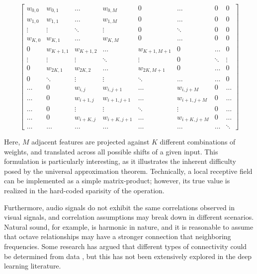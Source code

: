 \begingroup
\renewcommand*{\arraystretch}{0.8}
$$
\begin{bmatrix}
w_{0, 0} & w_{0, 1} & \dots  & w_{0, M} & 0 & \dots & 0 & 0 \\
w_{1, 0} & w_{1, 1} & \dots  & w_{1, M} & 0 & \dots & 0 & 0 \\
\vdots & \vdots & \ddots & \vdots & 0 & \ddots & 0 & 0 \\
w_{K, 0} & w_{K, 1} & \dots  & w_{K, M} & 0 & \dots & 0 & 0 \\
0 & w_{K + 1, 1} & w_{K + 1, 2} & \dots  & w_{K + 1, M + 1} & 0 & \dots & 0 \\
\vdots & \vdots & \vdots & \ddots & \vdots & 0 & \ddots & \vdots \\
0 & w_{2K, 1} & w_{2K, 2} & \dots  & w_{2K, M + 1} & 0 & \dots & 0 \\
0 & \ddots & \vdots & \vdots & \ddots & \dots & \dots & 0 \\
\dots & 0 & w_{i, j} & w_{i, j + 1} & \dots & w_{i, j + M} & 0 & \dots \\
\dots & 0 & w_{i + 1, j} & w_{i + 1, j + 1} & \dots & w_{i + 1, j + M} & 0  & \dots  \\
\dots & 0 & \vdots & \vdots & \ddots & \vdots & 0 & \dots \\
\dots & 0 & w_{i + K, j} & w_{i+K, j + 1} & \dots & w_{i + K, j + M} & 0  & \dots  \\
\dots & \dots & \dots & \dots & \dots & \dots & \dots & \ddots
\end{bmatrix}
$$
\endgroup

\noindent Here, $M$ adjacent features are projected against $K$ different combinations of weights, and translated across all possible shifts of a given input.
This formulation is particularly interesting, as it illustrates the inherent difficulty posed by the universal approximation theorem.
Technically, a local receptive field can be implemented as a simple matrix-product;
however, its true value is realized in the hard-coded sparisity of the operation.

Furthermore, audio signals do not exhibit the same correlations observed in visual signals, and correlation assumptions may break down in different scenarios.
Natural sound, for example, is harmonic in nature, and it is reasonable to assume that octave relationships may have a stronger connection that neighboring frequencies.
Some research has argued that different types of connectivity could be determined from data \cite{Coates2012?}, but this has not been extensively explored in the deep learning literature.


